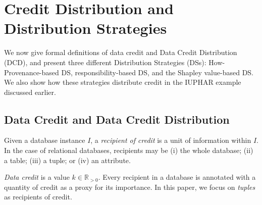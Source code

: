 \documentclass[preprint,12pt,sort&compress]{elsarticle}
\newcommand{\eat}[1]{}
\begin{document}
%

\section{Credit Distribution and Distribution Strategies}
\label{section:distribution_strategies}
We now give formal definitions of data credit and Data Credit Distribution (DCD), and present three different Distribution Strategies (DSs):  How-Provenance-based DS,  responsibility-based DS, and the Shapley value-based DS.  We also show how these strategies distribute credit in the IUPHAR example discussed earlier.


\subsection{Data Credit and Data Credit Distribution}
Given a database instance $I$, a \emph{recipient of credit} is a unit of information within $I$. In the case of relational databases, recipients may be (i) the whole database; (ii) a table; (iii) a tuple; or (iv) an attribute.

\emph{Data credit} is a value $k \in \mathbb{R}_{>0}$. 
Every recipient in a database is annotated with a quantity of credit as a proxy for its importance. In this paper, we focus on {\em tuples} as recipients of credit. 

\eat{\emph{Data Credit Distribution} (DCD) considers a database instance $I$, a certain quantity of credit $k$ (here, without loss of generality, deemed to be given), 
and a query $Q$ producing a result set $Q(I)$.  
DCD consists of defining a function, i.e., a \emph{distribution strategy} (DS), to split credit into portions to be assigned to the tuples in $I$.}
\end{document}
